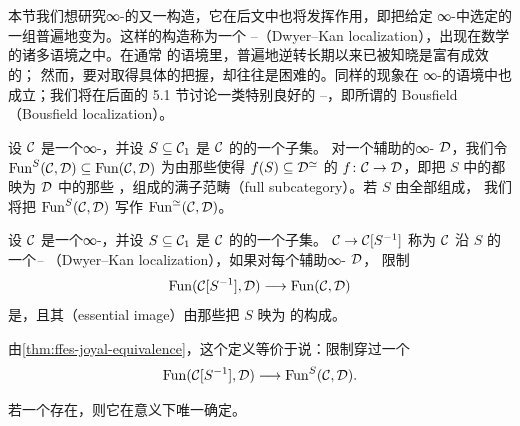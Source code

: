 \section{\trLocalization{}}
\label{sec:localizations}

本节我们想研究∞-\trCategories{}的又一构造，它在后文中也将发挥作用，即把给定%
∞-\trCategory{}中选定的一组\trMorphism{}普遍地变为\trInvertible{}。这样的构造称为一个%
\trDwyer{}--\trKan{}\trLocalization{}（Dwyer--Kan localization），出现在数学的诸多语境之中。在通常%
\trCategoryTheory{}的语境里，普遍地逆转\trMorphism{}长期以来已被知晓是富有成效的；
然而，要对\trLocalization{}取得具体的把握，却往往是困难的。同样的现象在%
∞-\trCategories{}的语境中也成立；我们将在后面的 5.1 节讨论一类特别良好的%
\trDwyer{}--\trKan{}\trLocalization{}，即所谓的 Bousfield \trLocalization{}（Bousfield
localization）。

\begin{definition}\label{def:fun-s}
设 $\mathcal{C}$ 是一个∞-\trCategory{}，并设 $S \subseteq \mathcal{C}_1$ 是 $\mathcal{C}$ 的\trMorphism{}的一个子集。
对一个辅助的∞-\trCategory{} $\mathcal{D}$，我们令
$\mathrm{Fun}^S(\mathcal{C}, \mathcal{D}) \subseteq \mathrm{Fun}(\mathcal{C}, \mathcal{D})$
为由那些使得 $f(S) \subseteq \mathcal{D}^{\simeq}$ 的\trFunctor{}%
$f\colon \mathcal{C} \to \mathcal{D}$，即把 $S$ 中的\trMorphism{}都映为 $\mathcal{D}$ 中\trEquivalence{}的那些%
\trFunctor{}，组成的满子范畴（full subcategory）。若 $S$ 由全部\trMorphism{}组成，
我们将把 $\mathrm{Fun}^S(\mathcal{C}, \mathcal{D})$ 写作 $\mathrm{Fun}^{\simeq}(\mathcal{C}, \mathcal{D})$。
\end{definition}

\begin{definition}\label{def:dwyer-kan-localization}
设 $\mathcal{C}$ 是一个∞-\trCategory{}，并设 $S \subseteq \mathcal{C}_1$ 是 $\mathcal{C}$ 的\trMorphism{}的一个子集。
\trFunctor{} $\mathcal{C} \to \mathcal{C}[S^{-1}]$ 称为 $\mathcal{C}$ 沿 $S$ 的一个\emph{\trDwyer{}--\trKan{}%
\trLocalization{}}（Dwyer--Kan localization），如果对每个辅助∞-\trCategory{} $\mathcal{D}$，
限制\trFunctor{}%
\[
\mathrm{Fun}(\mathcal{C}[S^{-1}], \mathcal{D}) \longrightarrow \mathrm{Fun}(\mathcal{C}, \mathcal{D})
\]
是\trFullyFaithful{}，且其\trEssentialImage{}（essential image）由那些把 $S$ 映为%
\trEquivalence{}的\trFunctor{}构成。
\end{definition}

\begin{remark}\label{rem:localization-factors}
由\cref{thm:ffes-joyal-equivalence}，这个定义等价于说：限制\trFunctor{}穿过一个%
\trJoyalEquivalence{}%
\[
\mathrm{Fun}(\mathcal{C}[S^{-1}], \mathcal{D}) \longrightarrow \mathrm{Fun}^S(\mathcal{C}, \mathcal{D}).
\]
\end{remark}

\begin{lemma}\label{lem:localization-unique}
若一个\trLocalization{}存在，则它在\trJoyalEquivalence{}意义下唯一确定。
\end{lemma}

